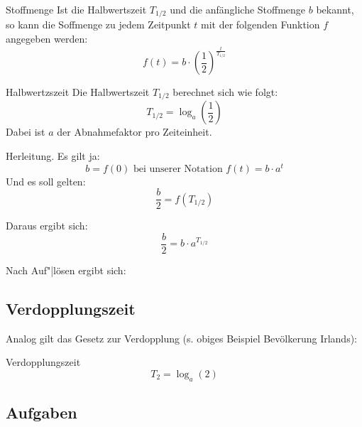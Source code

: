 \begin{gesetz}{Stoffmenge}{}
  Ist die Halbwertszeit $T_{1/2}$ und die anfängliche Stoffmenge $b$
  bekannt, so kann die Soffmenge zu jedem Zeitpunkt $t$ mit der
  folgenden Funktion $f$ angegeben werden:
  $$f(t) = b\cdot{}\left(\frac12\right)^\frac{t}{T_{1/2}}$$
\end{gesetz}
\newpage
  
\begin{gesetz}{Halbwertzszeit}{}
  Die Halbwertszeit $T_{1/2}$ berechnet sich wie folgt:
  $$T_{1/2} = \log_a\left(\frac12\right)$$
  Dabei ist $a$ der Abnahmefaktor pro Zeiteinheit.
\end{gesetz}



  Herleitung. Es gilt ja:
  $$b=f(0) \text{ bei unserer Notation } f(t) = b\cdot{}a^t$$
  Und es soll gelten:
  $$\frac{b}2 = f(T_{1/2})$$

  Daraus ergibt sich:
  $$\frac{b}2 = b\cdot{}a^{T_{1/2}}$$

    Nach Auf"|lösen ergibt sich:




\subsection{Verdopplungszeit}

Analog gilt das Gesetz zur Verdopplung (s. obiges Beispiel Bevölkerung Irlands):
\begin{gesetz}{Verdopplungszeit}{}
  $$T_2 = \log_a(2)$$
\end{gesetz}
\newpage


\subsection*{Aufgaben}



